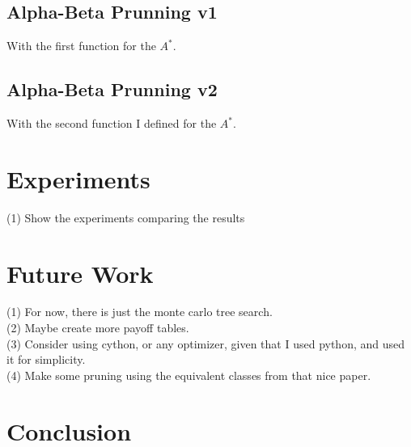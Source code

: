 \documentclass[10pt]{article}
\begin{document}
\subsection{Alpha-Beta Prunning v1}
With the first function for the $A^*$.

\subsection{Alpha-Beta Prunning v2}
With the second function I defined for the $A^*$.




\section{Experiments}
(1) Show the experiments comparing the results



\section{Future Work}
(1) For now, there is just the monte carlo tree search.\\
(2) Maybe create more payoff tables.\\
(3) Consider using cython, or any optimizer, given that I used python, and used it for simplicity.\\
(4) Make some pruning using the equivalent classes from that nice paper.



\section{Conclusion}
\end{document}
